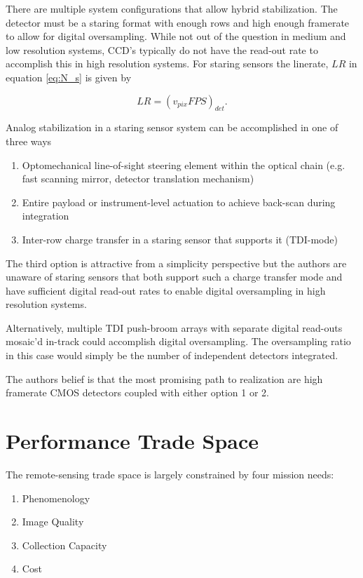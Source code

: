\documentclass[10pt,journal]{IEEEtran}  %
\begin{document}
There are multiple system configurations that allow hybrid stabilization.  The detector must be a staring format with enough rows and high enough framerate to allow for digital oversampling.  While not out of the question in medium and low resolution systems, CCD's typically do not have the read-out rate to accomplish this in high resolution systems.  For staring sensors the linerate, $LR$ in equation \eqref{eq:N_s} is given by

\begin{equation}
\label{eq:lr_framing}    
LR = \left(v_{pix}FPS\right)_{det}.
\end{equation}

Analog stabilization in a staring sensor system can be accomplished in one of three ways

\begin{enumerate}
    \item Optomechanical line-of-sight steering element within the optical chain (e.g. fast scanning mirror, detector translation mechanism) \cite{patent:dirk}
    \item Entire payload or instrument-level actuation to achieve back-scan during integration \cite{patent:jonny}
    \item Inter-row charge transfer in a staring sensor that supports it (TDI-mode)
\end{enumerate}

The third option is attractive from a simplicity perspective but the authors are unaware of staring sensors that both support such a charge transfer mode and have sufficient digital read-out rates to enable digital oversampling in high resolution systems.

Alternatively, multiple TDI push-broom arrays with separate digital read-outs mosaic'd in-track could accomplish digital oversampling.  The oversampling ratio in this case would simply be the number of independent detectors integrated.

The authors belief is that the most promising path to realization are high framerate CMOS detectors coupled with either option 1 or 2.

\section{Performance Trade Space}
\label{sec:trade_space}

The remote-sensing trade space is largely constrained by four mission needs:

\begin{enumerate}
\item Phenomenology
\item Image Quality
\item Collection Capacity
\item Cost
\end{enumerate}
\end{document}
